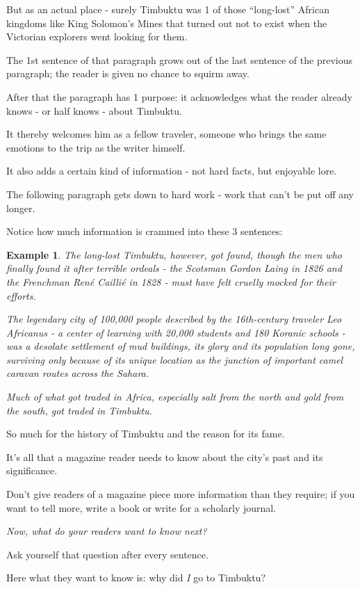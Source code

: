 \documentclass{book}
\numberwithin{equation}{section}
\newtheorem{example}{Example}[chapter]
\begin{document}
But as an actual place - surely Timbuktu was 1 of those ``long-lost'' African kingdoms like King Solomon's Mines that turned out not to exist when the Victorian explorers went looking for them.

%
The 1st sentence of that paragraph grows out of the last sentence of the previous paragraph; the reader is given no chance to squirm away.

After that the paragraph has 1 purpose: it acknowledges what the reader already knows - or half knows - about Timbuktu.

It thereby welcomes him as a fellow traveler, someone who brings the same emotions to the trip as the writer himself.

It also adds a certain kind of information - not hard facts, but enjoyable lore.

The following paragraph gets down to hard work - work that can't be put off any longer.

Notice how much information is crammed into these 3 sentences:
\begin{example}
    The long-lost Timbuktu, however, got found, though the men who finally found it after terrible ordeals - the Scotsman Gordon Laing in 1826 and the Frenchman Ren\'e Cailli\'e in 1828 - must have felt cruelly mocked for their efforts.
    
    The legendary city of 100,000 people described by the 16th-century traveler Leo Africanus - a center of learning with 20,000 students and 180 Koranic schools - was a desolate settlement of mud buildings, its glory and its population long gone, surviving only because of its unique location as the junction of important camel caravan routes across the Sahara.
    
    Much of what got traded in Africa, especially salt from the north and gold from the south, got traded in Timbuktu.
\end{example}
So much for the history of Timbuktu and the reason for its fame.

It's all that a magazine reader needs to know about the city's past and its significance.

Don't give readers of a magazine piece more information than they require; if you want to tell more, write a book or write for a scholarly journal.

%
\textit{Now, what do your readers want to know next?}

Ask yourself that question after every sentence.

Here what they want to know is: why did \textit{I} go to Timbuktu?
\end{document}
